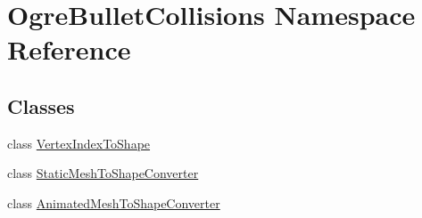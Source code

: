 \hypertarget{namespace_ogre_bullet_collisions}{\section{Ogre\-Bullet\-Collisions Namespace Reference}
\label{namespace_ogre_bullet_collisions}
}
\subsection*{Classes}
\begin{DoxyCompactItemize}
\item 
class \hyperlink{class_ogre_bullet_collisions_1_1_vertex_index_to_shape}{Vertex\-Index\-To\-Shape}
\item 
class \hyperlink{class_ogre_bullet_collisions_1_1_static_mesh_to_shape_converter}{Static\-Mesh\-To\-Shape\-Converter}
\item 
class \hyperlink{class_ogre_bullet_collisions_1_1_animated_mesh_to_shape_converter}{Animated\-Mesh\-To\-Shape\-Converter}
\end{DoxyCompactItemize}
